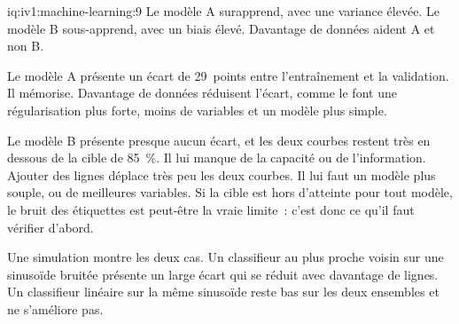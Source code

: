 \begin{solution}{iq:iv1:machine-learning:9}
Le modèle A surapprend, avec une variance élevée. Le modèle B sous-apprend, avec un biais élevé. Davantage de données aident A et non B.

Le modèle A présente un écart de 29~points entre l'entraînement et la validation. Il mémorise. Davantage de données réduisent l'écart, comme le font une régularisation plus forte, moins de variables et un modèle plus simple.

Le modèle B présente presque aucun écart, et les deux courbes restent très en dessous de la cible de 85~\%. Il lui manque de la capacité ou de l'information. Ajouter des lignes déplace très peu les deux courbes. Il lui faut un modèle plus souple, ou de meilleures variables. Si la cible est hors d'atteinte pour tout modèle, le bruit des étiquettes est peut-être la vraie limite~: c'est donc ce qu'il faut vérifier d'abord.

Une simulation montre les deux cas. Un classifieur au plus proche voisin sur une sinusoïde bruitée présente un large écart qui se réduit avec davantage de lignes. Un classifieur linéaire sur la même sinusoïde reste bas sur les deux ensembles et ne s'améliore pas.



\end{solution}

